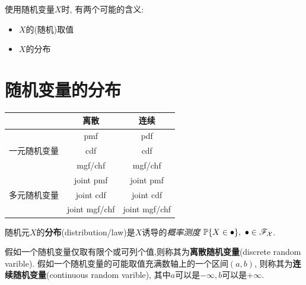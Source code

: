 \documentclass[../main]{subfiles}
\begin{document}
\begin{remark}
    使用随机变量$X$时, 有两个可能的含义:
    \begin{itemize}
        \item $X$的(随机)取值
        \item $X$的分布
    \end{itemize}
\end{remark}

\section{随机变量的分布}

\begin{table}[]
    \centering
    \begin{tabular}{|c|c|c|}
        \hline
                                      & 离散          & 连续          \\ \hline
        \multirow{3}{*}{一元随机变量} & pmf           & pdf           \\ \cline{2-3}
                                      & cdf           & cdf           \\ \cline{2-3}
                                      & mgf/chf       & mgf/chf       \\ \hline
        \multirow{3}{*}{多元随机变量} & joint pmf     & joint pmf     \\ \cline{2-3}
                                      & joint cdf     & joint cdf     \\ \cline{2-3}
                                      & joint mgf/chf & joint mgf/chf \\ \hline
    \end{tabular}
\end{table}

\begin{definition}
    随机元$X$的\textbf{分布}(distribution/law)是$X$诱导的\emph{概率测度}
    $\P\{X\in\bullet\},\ \bullet\in\mathscr{F}_{\mathcal{X}}$.
\end{definition}

\begin{definition}[离散与连续随机变量]
    假如一个随机变量仅取有限个或可列个值,则称其为\textbf{离散随机变量}(discrete random varible). 假如一个随机变量的可能取值充满数轴上的一个区间$ (a,b) $, 则称其为\textbf{连续随机变量}(continuous random varible), 其中$ a $可以是$ -\infty ,b $可以是$ +\infty $.
\end{definition}
\end{document}
